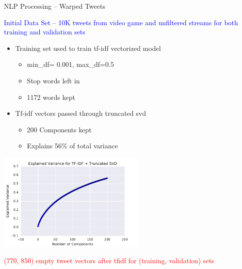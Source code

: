\documentclass[aspectratio=169,handout]{beamer}
\begin{document}
\begin{frame}{NLP Processing -- Warped Tweets}
  \begin{center}
    \textcolor{blue}{Initial Data Set -- 10K tweets from video game
      and unfiltered streams for both  training and validation sets}
  \end{center}

  \begin{multicols}{2}
  \begin{itemize}
  \item Training set used to train tf-idf vectorized model
    \begin{itemize}
    \item min\_df= 0.001, max\_df=0.5
    \item Stop words left in
    \item 1172 words kept
    \end{itemize}
  \item Tf-idf vectors passed through truncated svd
    \begin{itemize}
    \item 200 Components kept
    \item Explains 56\% of total variance
    \end{itemize}
  \end{itemize}

  \includegraphics[width=0.55\textwidth]{variation.pdf}
  \end{multicols}

  \begin{center}
    \textcolor{red}{(770, 850) empty tweet vectors after tfidf for
      (training, validation) sets}
  \end{center}
 
\end{frame}
\end{document}
